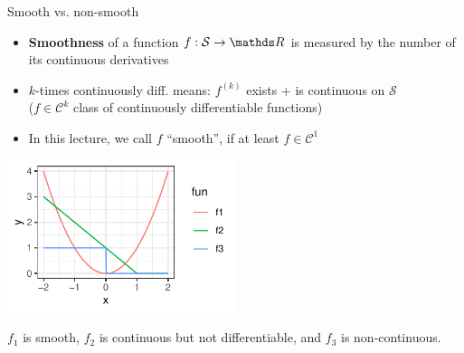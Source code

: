 \begin{vbframe}{Smooth vs. non-smooth}

\begin{itemize}
\item \textbf{Smoothness} of a function  $f: \mathcal{S} \to \R$ is measured by the number of its continuous derivatives
\item $k$-times continuously diff. means: $f^{(k)}$ exists + is continuous on $\mathcal{S}$\\
($f \in \mathcal{C}^k$ class of continuously differentiable functions) 
\item In this lecture, we call $f$ \enquote{smooth}, if at least $f \in \mathcal{C}^1$
\end{itemize}


\begin{center}
\includegraphics[width = 0.5\textwidth]{figure_man/hinge_vs_l2.pdf} \\ 
\begin{footnotesize}
$f_1$ is smooth, $f_2$ is continuous but not differentiable, and $f_3$ is non-continuous. 
\end{footnotesize}
\end{center}


\end{vbframe}

